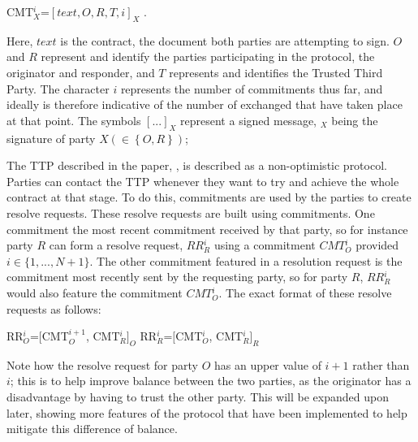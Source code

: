 \documentclass{l4proj}
\begin{document}
\centerline{CMT${_{X}^{i}}$=$[text, O, R, T, i]_X $ .}

Here, $text$ is the contract, the document both parties are attempting to sign. $O$ and $R$ represent and identify the parties participating in the protocol, the originator and responder, and $T$ represents and identifies the Trusted Third Party. The character $i$ represents the number of commitments thus far, and ideally is therefore indicative of the number of exchanged that have taken place at that point. The symbols $[...]_X$ represent a signed message, $_X$ being the signature of party $X \left ( \in \left \{ O,R \right \} \right )$;

The TTP described in the paper, \cite{ASW09}, is described as a non-optimistic protocol. Parties can contact the TTP whenever they want to try and achieve the whole contract at that stage. To do this, commitments are used by the parties to create resolve requests. These resolve requests are built using commitments. One commitment the most recent commitment received by that party, so for instance party $R$ can form a resolve request, $RR{_{R}^{i}}$ using a commitment $CMT{_{O}^i}$ provided $i \in \{1,...,N+1\}$. The other commitment featured in a resolution request is the commitment most recently sent by the requesting party, so for party $R$, $RR{_{R}^{i}}$ would also feature the commitment $CMT{_{O}^i}$. The exact format of these resolve requests as follows:\\

\centerline{RR${_{O}^{i}}$=$[$CMT${_{O}^{i+1}}$, CMT${_{R}^{i}}]_O$ \hspace{30mm}  RR${_{R}^{i}}$=$[$CMT${_{O}^{i}}$, CMT${_{R}^{i}}]_R$}

Note how the resolve request for party $O$ has an upper value of $i+1$ rather than $i$; this is to help improve balance between the two parties, as the originator has a disadvantage by having to trust the other party. This will be expanded upon later, showing more features of the protocol that have been implemented to help mitigate this difference of balance.
\end{document}
